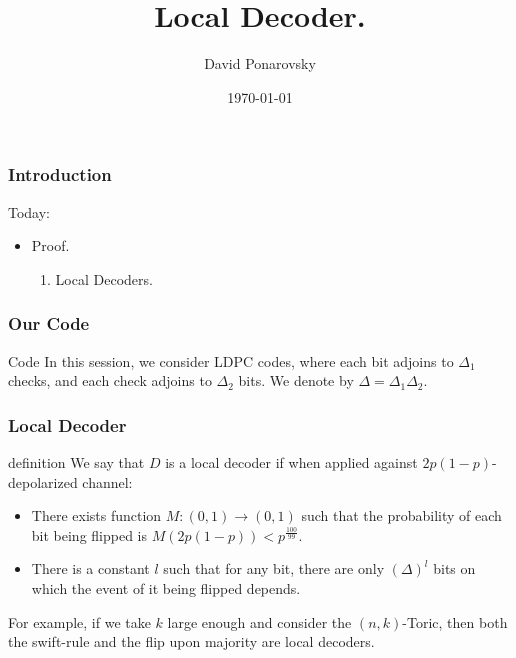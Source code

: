 \documentclass{beamer}
\begin{document}
 



\begin{frame}
  \title{Local Decoder.}
    \author{David Ponarovsky}
    \date{\today}
    \titlepage
\end{frame}


\begin{frame}

\frametitle{Introduction}
\begin{block}{Today:}
\begin{itemize}
  \item Proof. 
    \begin{enumerate}
      \item Local Decoders.
    \end{enumerate}
\end{itemize}
\end{block}
\end{frame}

  
\begin{frame}
  \frametitle{Our Code}

  \begin{block}{Code}
    In this session, we consider LDPC codes, where each bit adjoins to $\Delta_{1}$ checks, and each check adjoins to $\Delta_{2}$ bits. We denote by $\Delta = \Delta_{1}\Delta_{2}$.
  \end{block}


\end{frame}

\begin{frame}
  \frametitle{Local Decoder} 
  
  \begin{block}{definition}
    We say that $D$ is a local decoder if when applied against $2p(1-p)$-depolarized channel: 
    \begin{itemize}
      \item  There exists function $M : (0,1) \rightarrow (0,1) $ such that the probability of each bit being flipped is $M(2p(1-p)) < p^{\frac{100}{99}}$.
      \item There is a constant $l$ such that for any bit, there are only $(\Delta)^{l}$ bits on which the event of it being flipped depends.
    \end{itemize}
For example, if we take $k$ large enough and consider the $(n,k)$-Toric, then both the swift-rule and the flip upon majority are local decoders.
  \end{block}
\end{frame}
\end{document}
